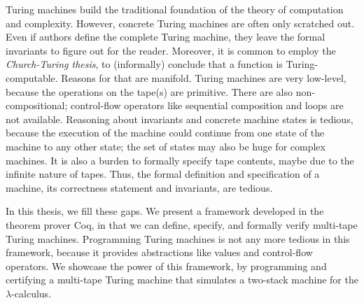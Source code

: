 Turing machines build the traditional foundation of the theory of computation and complexity.  However, concrete Turing machines are often only
scratched out.  Even if authors define the complete Turing machine, they leave the formal invariants to figure out for the reader.  Moreover, it is
common to employ the \textit{Church-Turing thesis}, to (informally) conclude that a function is Turing-computable.  Reasons for that are manifold.
Turing machines are very low-level, because the operations on the tape(s) are primitive.  There are also non-compositional; control-flow operators
like sequential composition and loops are not available.  Reasoning about invariants and concrete machine states is tedious, because the execution of
the machine could continue from one state of the machine to any other state; the set of states may also be huge for complex machines.  It is also a
burden to formally specify tape contents, maybe due to the infinite nature of tapes.  Thus, the formal definition and specification of a machine, its
correctness statement and invariants, are tedious.

In this thesis, we fill these gaps.  We present a framework developed in the theorem prover Coq, in that we can define, specify, and formally verify
multi-tape Turing machines.  Programming Turing machines is not any more tedious in this framework, because it provides abstractions like values and
control-flow operators.  We showcase the power of this framework, by programming and certifying a multi-tape Turing machine that simulates a two-stack
machine for the $\lambda$-calculus.


